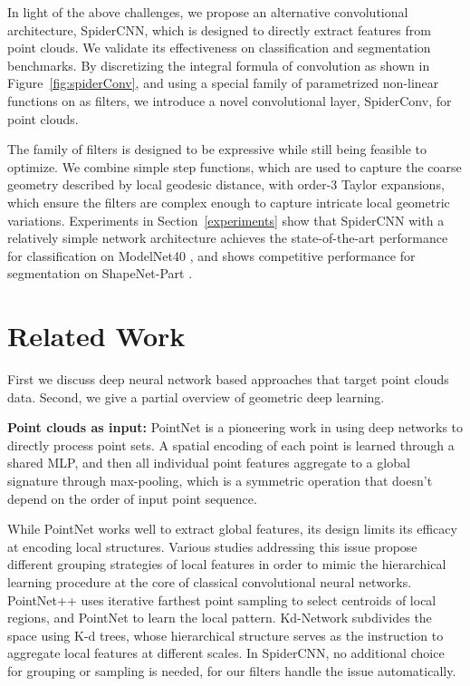 \documentclass[runningheads]{llncs}
\begin{document}
In light of the above challenges, we propose an alternative convolutional architecture, SpiderCNN, which is designed to directly extract features from point clouds. We validate its effectiveness on classification and segmentation benchmarks.
By discretizing the integral formula of convolution as shown in Figure~\ref{fig:spiderConv}, and using a special family of parametrized non-linear functions on  as filters, we introduce a novel convolutional layer, SpiderConv, for point clouds.

The family of filters is designed to be expressive while still being feasible to optimize. We combine simple step functions, which are used to capture the coarse geometry described by local geodesic distance, with order-3 Taylor expansions, which ensure the filters are complex enough to capture intricate local geometric variations. Experiments in Section~\ref{experiments} show that  SpiderCNN with a relatively simple network architecture achieves the state-of-the-art performance for classification on ModelNet40 \cite{chang2015shapenet}, and shows competitive performance for segmentation on ShapeNet-Part \cite{chang2015shapenet}.

\section{Related Work}

First we discuss deep neural network based approaches that target point clouds data. Second, we give a partial overview of geometric deep learning. 

{\noindent \bf Point clouds as input:}
PointNet \cite{qi2017pointnet} is a pioneering work in using deep networks to directly process point sets. A spatial encoding of each point is learned through a shared MLP, and then all individual point features aggregate to a global signature through max-pooling, which is a symmetric operation that doesn't depend on the order of input point sequence. 

While PointNet works well to extract global features, its design limits its efficacy at encoding local structures. Various studies addressing this issue propose different grouping strategies of local features in order to mimic the hierarchical learning procedure at the core of classical convolutional neural networks.
PointNet++ \cite{qi2017pointnet++} uses iterative farthest point sampling to select centroids of local regions, and PointNet to learn the local pattern. Kd-Network \cite{klokov2017escape} subdivides the space using K-d trees, whose hierarchical structure serves as the instruction to aggregate local features at different scales. In SpiderCNN, no additional choice for grouping or sampling is needed, for our filters handle the issue automatically. 
 
\end{document}
